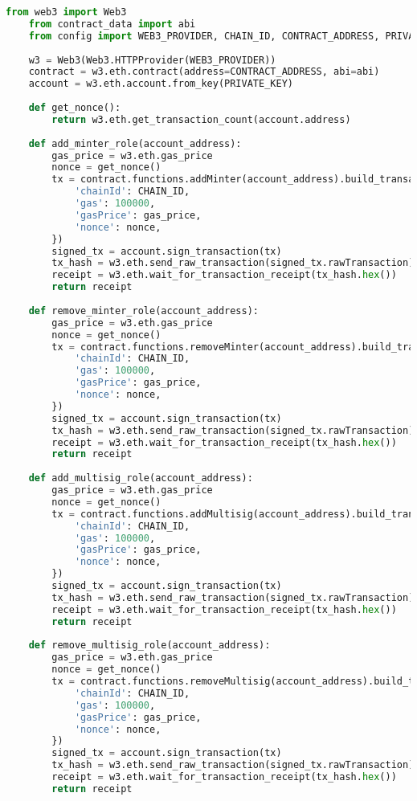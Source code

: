 \begin{lstlisting}[language=Python, caption=Модуль управления ролями]
    from web3 import Web3
    from contract_data import abi
    from config import WEB3_PROVIDER, CHAIN_ID, CONTRACT_ADDRESS, PRIVATE_KEY
    
    w3 = Web3(Web3.HTTPProvider(WEB3_PROVIDER))
    contract = w3.eth.contract(address=CONTRACT_ADDRESS, abi=abi)
    account = w3.eth.account.from_key(PRIVATE_KEY)
    
    def get_nonce():
        return w3.eth.get_transaction_count(account.address)
    
    def add_minter_role(account_address):
        gas_price = w3.eth.gas_price
        nonce = get_nonce()
        tx = contract.functions.addMinter(account_address).build_transaction({
            'chainId': CHAIN_ID,
            'gas': 100000,
            'gasPrice': gas_price,
            'nonce': nonce,
        })
        signed_tx = account.sign_transaction(tx)
        tx_hash = w3.eth.send_raw_transaction(signed_tx.rawTransaction)
        receipt = w3.eth.wait_for_transaction_receipt(tx_hash.hex())
        return receipt
    
    def remove_minter_role(account_address):
        gas_price = w3.eth.gas_price
        nonce = get_nonce()
        tx = contract.functions.removeMinter(account_address).build_transaction({
            'chainId': CHAIN_ID,
            'gas': 100000,
            'gasPrice': gas_price,
            'nonce': nonce,
        })
        signed_tx = account.sign_transaction(tx)
        tx_hash = w3.eth.send_raw_transaction(signed_tx.rawTransaction)
        receipt = w3.eth.wait_for_transaction_receipt(tx_hash.hex())
        return receipt
    
    def add_multisig_role(account_address):
        gas_price = w3.eth.gas_price
        nonce = get_nonce()
        tx = contract.functions.addMultisig(account_address).build_transaction({
            'chainId': CHAIN_ID,
            'gas': 100000,
            'gasPrice': gas_price,
            'nonce': nonce,
        })
        signed_tx = account.sign_transaction(tx)
        tx_hash = w3.eth.send_raw_transaction(signed_tx.rawTransaction)
        receipt = w3.eth.wait_for_transaction_receipt(tx_hash.hex())
        return receipt
    
    def remove_multisig_role(account_address):
        gas_price = w3.eth.gas_price
        nonce = get_nonce()
        tx = contract.functions.removeMultisig(account_address).build_transaction({
            'chainId': CHAIN_ID,
            'gas': 100000,
            'gasPrice': gas_price,
            'nonce': nonce,
        })
        signed_tx = account.sign_transaction(tx)
        tx_hash = w3.eth.send_raw_transaction(signed_tx.rawTransaction)
        receipt = w3.eth.wait_for_transaction_receipt(tx_hash.hex())
        return receipt    
\end{lstlisting}

